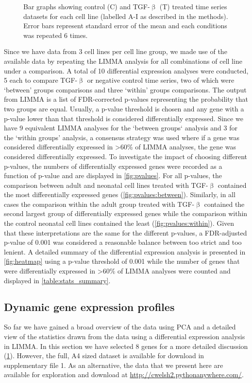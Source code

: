 \documentclass[alpha-refs]{wiley-article}
\newcommand{\tgf}{TGF-$\upbeta$}
\begin{document}
\begin{figure}[p]
\begin{minipage}{0.1\textwidth}
	\end{minipage}
	\caption{Bar graphs showing control (C) and \tgf{} (T) treated time series datasets for each cell line (labelled A-I as described in the methods). Error bars represent standard error of the mean and each conditions was repeated 6 times.}
	\label{fig:bar_graphs}
\end{figure}
Since we have data from 3 cell lines per cell line group, we made use of the available data by repeating the LIMMA analysis for all combinations of cell line under a comparison. A total of 10 differential expression analyses were conducted, 5 each to compare \tgf{} or negative control time series, two of which were `between' groups comparisons and three `within' groups comparisons. The output from LIMMA is a list of FDR-corrected p-values representing the probability that two groups are equal. Usually, a p-value threshold is chosen and any gene with a p-value lower than that threshold is considered differentially expressed. Since we have 9 equivalent LIMMA analyses for the `between groups` analysis and 3 for the `within groups' analysis, a consensus strategy was used where if a gene was considered differentially expressed in >60\% of LIMMA analyses, the gene was considered differentially expressed. To investigate the impact of choosing different p-values, the numbers of differentially expressed genes were recorded as a function of p-value and are displayed in \cref{fig:pvalues}. For all p-values, the comparison between adult and neonatal cell lines treated with \tgf{} contained the most differentially expressed genes (\cref{fig:pvalues:between}). Similarly, in all cases the comparison within the adult group treated with \tgf{} contained the second largest group of differentially expressed genes while the comparison within the control neonatal cell lines contained the least (\cref{fig:pvalues:within}). Given that these interpretations are the same for the different p-values, a FDR-adjusted p-value of 0.001 was considered a reasonable balance between too strict and too lenient. A detailed summary of the differential expression analysis is presented in \cref{fig:heatmap} using a p-value threshold of 0.001 while the number of genes that were differentially expressed in >60\% of LIMMA analyses were counted and displayed in \cref{table:stats_summary}.

\subsection{Dynamic gene expression profiles}
So far we have gained a broad overview of the data using PCA and a detailed view of the statistics drawn from the data using a differential expression analysis in LIMMA. In this section we have selected 8 genes for a more detailed discussion (\cref{fig:bar_graphs}). However, the full, A4 sized dataset is available for download in supplementary file 1. As an alternative, the data that we present here are available for exploration and download at \url{http://cwelsh2.pythonanywhere.com/}. 
\end{document}
